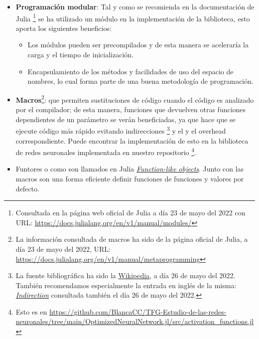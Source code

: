 
\begin{itemize}
    \item \textbf{Programación modular}: Tal y como se recomienda en la documentación de Julia \footnote{
        Consultada en la página web oficial de Julia  a día 23 de mayo del 2022 con URL: \url{https://docs.julialang.org/en/v1/manual/modules/}
    } se ha utilizado un módulo en la implementación de la biblioteca, esto aporta los siguientes beneficios: 
    \begin{itemize}
        \item Los módulos pueden ser precompilados y de esta manera se aceleraría la carga y el tiempo de inicialización. 
        \item Encapsulamiento de los métodos y facilidades de uso del espacio de nombres, lo cual forma parte
        de una buena metodología de programación. 
    \end{itemize}

    \item \textbf{Macros}\footnote{La información consultada de macros ha sido  de la página oficial de Julia, a día 23 de mayo del 2022, URL:
    \url{https://docs.julialang.org/en/v1/manual/metaprogramming}}:
    que permiten sustituciones de código cuando el código es analizado por el compilador; 
    de esta manera, funciones que devuelven otras funciones dependientes de un parámetro se verán beneficiadas,
    ya que hace que se ejecute código más rápido evitando indirecciones \footnote{La fuente bibliográfica ha sido la \href{https://es.wikipedia.org/wiki/Indirección}{Wikipedia}, a día 26 de mayo del 2022.
    También recomendamos especialmente la entrada en inglés de la misma:
    \href{https://en.wikipedia.org/wiki/Indirection}{\textit{Indirection}}
    consultada también el día 26 de mayo del 2022.
    }  y el y el overhead correspondiente. 
     Puede encontrar la implementación de esto en la biblioteca de redes neuronales implementada en nuestro 
     repositorio 
     \footnote{
         Esto es en \url{https://github.com/BlancaCC/TFG-Estudio-de-las-redes-neuronales/tree/main/OptimizedNeuralNetwork.jl/src/activation_functions.jl}
     }.

     \item Funtores o como son llamados en Julia \href{https://docs.julialang.org/en/v1/manual/methods/#Function-like-objects}{\textit{Function-like objects}}. Junto con las macros son una forma eficiente definir funciones de funciones y valores por defecto. 
\end{itemize}

